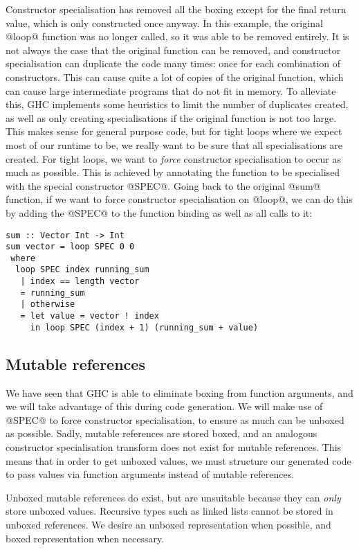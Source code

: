 Constructor specialisation has removed all the boxing except for the final return value, which is only constructed once anyway.
In this example, the original @loop@ function was no longer called, so it was able to be removed entirely.
It is not always the case that the original function can be removed, and constructor specialisation can duplicate the code many times: once for each combination of constructors.
This can cause quite a lot of copies of the original function, which can cause large intermediate programs that do not fit in memory.
To alleviate this, GHC implements some heuristics to limit the number of duplicates created, as well as only creating specialisations if the original function is not too large.
This makes sense for general purpose code, but for tight loops where we expect most of our runtime to be, we really want to be sure that all specialisations are created.
For tight loops, we want to \emph{force} constructor specialisation to occur as much as possible.
This is achieved by annotating the function to be specialised with the special constructor @SPEC@.
Going back to the original @sum@ function, if we want to force constructor specialisation on @loop@, we can do this by adding the @SPEC@ to the function binding as well as all calls to it:

\begin{lstlisting}
sum :: Vector Int -> Int
sum vector = loop SPEC 0 0
 where
  loop SPEC index running_sum
   | index == length vector
   = running_sum
   | otherwise
   = let value = vector ! index
     in loop SPEC (index + 1) (running_sum + value)
\end{lstlisting}

\subsection{Mutable references}
\label{ss:extraction:mutablerefs}

We have seen that GHC is able to eliminate boxing from function arguments, and we will take advantage of this during code generation.
We will make use of @SPEC@ to force constructor specialisation, to ensure as much can be unboxed as possible.
Sadly, mutable references are stored boxed, and an analogous constructor specialisation transform does not exist for mutable references.
This means that in order to get unboxed values, we must structure our generated code to pass values via function arguments instead of mutable references.

Unboxed mutable references do exist, but are unsuitable because they can \emph{only} store unboxed values.
Recursive types such as linked lists cannot be stored in unboxed references.
We desire an unboxed representation when possible, and boxed representation when necessary.


